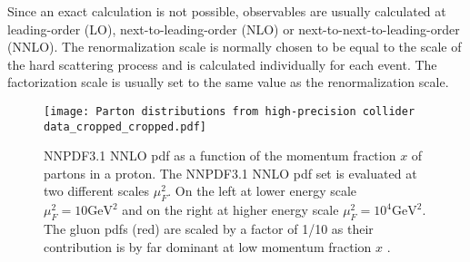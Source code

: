 \indent Since an exact calculation is not possible, observables are usually calculated at leading-order (LO), next-to-leading-order (NLO) or next-to-next-to-leading-order (NNLO). The renormalization scale is normally chosen to be equal to the scale of the hard scattering process and is calculated individually for each event. The factorization scale is usually set to the same value as the renormalization scale. 
\begin{figure}[H]
    \centering
    \texttt{[image: Parton distributions from high-precision collider data\_cropped\_cropped.pdf]}
    \caption{NNPDF3.1 NNLO pdf as a function of the momentum fraction $x$ of partons in a proton. The NNPDF3.1 NNLO pdf set is evaluated at two different scales $\mu_F^2$. On the left at lower energy scale $\mu_F^2 = 10 \text{GeV}^2$ and on the right at higher energy scale $\mu_F^2 = 10^4 \text{GeV}^2$. The gluon pdfs (red) are scaled by a factor of 1/10 as their contribution is by far dominant at low momentum fraction $x$ \cite{Ball2017}.}
    \label{fig:PDF}
\end{figure}

